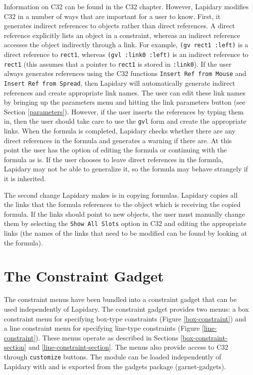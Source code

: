 Information on C32 can be found in the
C32 chapter. However, Lapidary modifies C32 in a number of ways that
are important for a user to know. First, it generates indirect references
to objects rather than direct references. A direct reference explicitly
lists an object in a constraint, whereas an indirect reference accesses
the object indirectly through a link. For example, {\tt (gv rect1 :left)} is
a direct reference to {\tt rect1}, whereas
{\tt (gvl :link0 :left)} is an indirect reference to {\tt rect1} (this assumes
that a pointer to {\tt rect1} is stored in {\tt :link0}). If the
user always generates
references using the C32 functions {\tt Insert Ref from Mouse} and
{\tt Insert Ref from Spread}, then Lapidary will automatically generate
indirect references and create appropriate link names. The user can
edit these link names by bringing up the parameters menu and hitting
the link parameters button (see Section \ref{parameters}).
However, if the user inserts the references by typing them in, then
the user should take care to use the {\tt gvl} form and create the appropriate
links. When the formula is completed, Lapidary checks whether there are
any direct references in the formula and generates a warning if there are.
At this point the user has the option of editing the formula or continuing
with the formula as is. If the user chooses to leave direct references in
the formula, Lapidary may not be able to generalize it, so the formula may
behave strangely if it is inherited.

The second change Lapidary makes is in copying formulas. Lapidary copies
all the links that the formula references to the object which is receiving
the copied formula. If the
links should point to new objects, the user must manually change them
by selecting the {\tt Show All Slots} option in C32 and editing the
appropriate links (the names of the links that need to be modified can be
found by looking at the formula).


\section{The Constraint Gadget}
\label{constraint-gadget}

The constraint menus have been bundled into a constraint gadget that can
be used independently of Lapidary.
The constraint gadget provides two menus: a box constraint menu for specifying
box-type constraints (Figure \ref{box-constraint})
and a line constraint menu for specifying line-type
constraints (Figure \ref{line-constraint}). These menus operate as
described in Sections \ref{box-constraint-section} and
\ref{line-constraint-section}. The menus also provide
access to C32 through {\tt customize} buttons.
The module can be loaded
independently of Lapidary with
 and
is exported from the gadgets package (garnet-gadgets).

